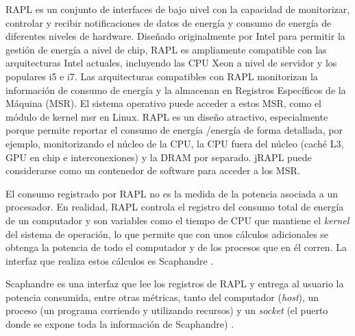 \documentclass[12pt, letter paper]{report}
\begin{document}
        \begin{displayquote}
          RAPL es un conjunto de interfaces de bajo nivel con la capacidad de
          monitorizar, controlar y recibir notificaciones de datos de energía y
          consumo de energía de diferentes niveles de hardware. Diseñado
          originalmente por Intel para permitir la gestión de energía a nivel de
          chip, RAPL es ampliamente compatible con las arquitecturas Intel
          actuales, incluyendo las CPU Xeon a nivel de servidor y los populares
          i5 e i7. Las arquitecturas compatibles con RAPL monitorizan la
          información de consumo de energía y la almacenan en Registros
          Específicos de la Máquina (MSR). El sistema operativo puede acceder a
          estos MSR, como el módulo de kernel msr en Linux. RAPL es un diseño
          atractivo, especialmente porque permite reportar el consumo de energía
          /energía de forma detallada, por ejemplo, monitorizando el núcleo de
          la CPU, la CPU fuera del núcleo (caché L3, GPU en chip e
          interconexiones) y la DRAM por separado. jRAPL puede considerarse
          como un contenedor de software para acceder a los MSR.
          \cite{kliu20kliu20jrapl2014}
        \end{displayquote}

        El consumo registrado por RAPL no es la medida de la potencia asociada
        a un procesador. En realidad, RAPL controla el registro del consumo
        total de energía de un computador y son variables como el tiempo de CPU
        que mantiene el \textit{kernel} del sistema de operación, lo que permite
        que con unos cálculos adicionales se obtenga la potencia de todo el
        computador y de los procesos que en él corren. La interfaz que realiza
        estos cálculos es Scaphandre \cite{hubblointroduction2025,
        hubblohubblo-orgscaphandre2025}.

        Scaphandre es una interfaz que lee los registros de RAPL y entrega al
        usuario la potencia consumida, entre otras métricas, tanto del
        computador (\textit{host}), un proceso (un programa corriendo y
        utilizando recursos) y un \textit{socket} (el puerto donde se expone
        toda la información de Scaphandre) \cite{hubblointroduction2025,
        hubblohubblo-orgscaphandre2025}.
\end{document}
